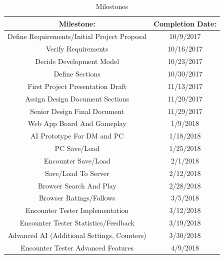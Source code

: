 \documentclass[12pt,a4paper]{report}
\begin{document}
	\begin{table}[H]
		\begin{center}
			\begin{tabular}{ |c|c| } 
				\hline
				Milestone: & Completion Date: \\
				\hline
				Define Requirements/Initial Project Proposal & 10/9/2017 \\
				Verify Requirements & 10/16/2017 \\
				Decide Development Model & 10/23/2017 \\
				Define Sections & 10/30/2017 \\
				First Project Presentation Draft & 11/13/2017 \\
				Assign Design Document Sections & 11/20/2017 \\
				Senior Design Final Document & 11/29/2017 \\
				Web App Board And Gameplay & 1/9/2018 \\
				AI Prototype For DM and PC & 1/18/2018 \\ 
				PC Save/Load & 1/25/2018 \\
				Encounter Save/Load & 2/1/2018 \\
				Save/Load To Server & 2/12/2018 \\
				Browser Search And Play & 2/28/2018 \\
				Browser Ratings/Follows & 3/5/2018 \\
				Encounter Tester Implementation & 3/12/2018 \\
				Encounter Tester Statistics/Feedback & 3/19/2018 \\
				Advanced AI (Additional Settings, Counters) & 3/30/2018 \\
				Encounter Tester Advanced Features & 4/9/2018 \\	
				\hline
			\end{tabular}
		\end{center}
		\caption{Milestones} \label{table: milestones}
	\end{table}
	
\end{document}
